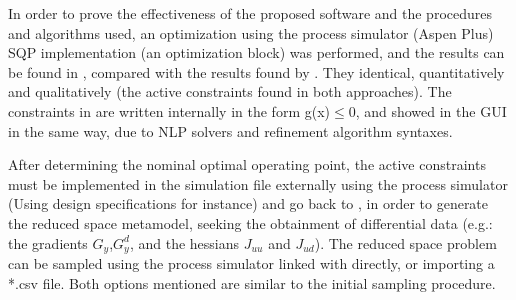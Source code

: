 \documentclass[../../msc-thesis.tex]{subfiles}
\begin{document}
In order to prove the effectiveness of the proposed software and the 
procedures and algorithms used, an optimization using the process
simulator (Aspen Plus) SQP implementation (an optimization block) was 
performed, and the results can be found in 
, compared with the results 
found by \mtc. They identical, quantitatively and 
qualitatively (the active constraints found in both approaches). The 
constraints in \mtc are written internally in the form g(x)$\leq 0$, and 
showed in the GUI in the same way, due to NLP solvers and refinement 
algorithm syntaxes.

\begin{table}[htb]
    \centering
    \caption{Optimization runs: \textit{Aspen Plus vs Metacontrol} - Decision
    variables and objective function - CPU Process}
    \label{tab:optcomparison1}
\end{table}

\begin{table}[htb]
    \centering
    \caption{Optimization runs: \textit{Aspen Plus vs Metacontrol} - Process
    constraints - CPU Process}
    \label{tab:optcomparison2}
\end{table}

After determining the nominal optimal operating point, the active
constraints must be implemented in the simulation file externally using the 
process simulator (Using design specifications for instance) and go back to 
\mtc, in order to generate the reduced space \kriging metamodel, seeking the 
obtainment of differential data (e.g.: the gradients $G_{y}$,$G_{y}^{d}$, 
and the hessians $J_{uu}$ and $J_{ud}$). The reduced space problem can be 
sampled using the process simulator linked with \mtc directly, or importing 
a *.csv file. Both options mentioned are similar to the initial sampling 
procedure. 
\end{document}
